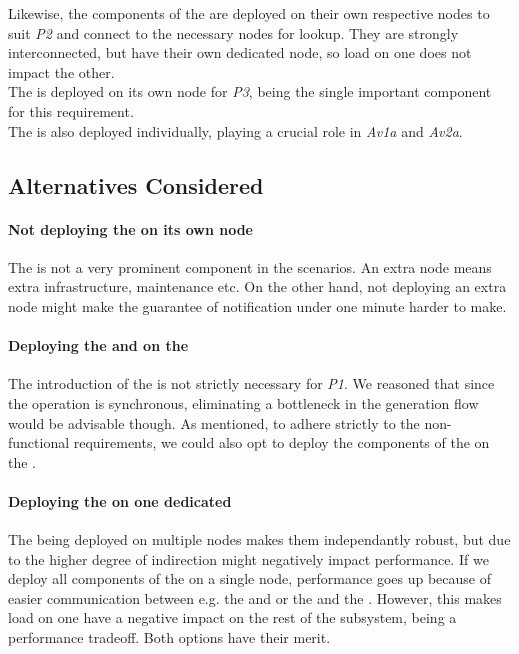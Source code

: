 Likewise, the components of the  are deployed on their own respective nodes to suit \emph{P2} and connect to the necessary nodes for lookup. They are strongly interconnected, but have their own dedicated node, so load on one does not impact the other.\\
The  is deployed on its own node for \emph{P3}, being the single important component for this requirement.\\
The  is also deployed individually, playing a crucial role in \emph{Av1a} and \emph{Av2a}.

\subsection*{Alternatives Considered}
\paragraph{Not deploying the  on its own node} The  is not a very prominent component in the scenarios. An extra node means extra infrastructure, maintenance etc. On the other hand, not deploying an extra node might make the guarantee of notification under one minute harder to make.

\paragraph{Deploying the  and  on the } The introduction of the  is not strictly necessary for \emph{P1}. We reasoned that since the  operation is synchronous, eliminating a bottleneck in the generation flow would be advisable though. As mentioned, to adhere strictly to the non-functional requirements, we could also opt to deploy the components of the  on the .

\paragraph{Deploying the  on one dedicated } The  being deployed on multiple nodes makes them independantly robust, but due to the higher degree of indirection might negatively impact performance. If we deploy all components of the  on a single node, performance goes up because of easier communication between e.g. the  and  or the  and the . However, this makes load on one  have a negative impact on the rest of the subsystem, being a performance tradeoff. Both options have their merit.